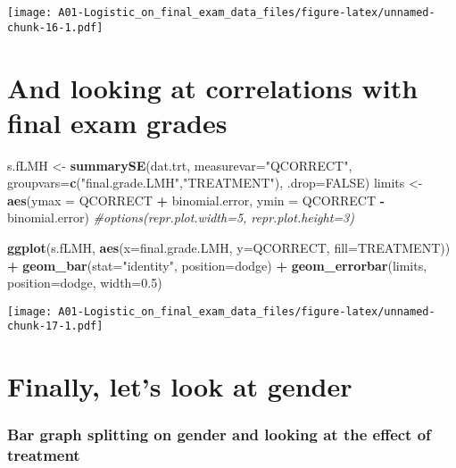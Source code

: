 \documentclass[]{article}
\newenvironment{Shaded}{\begin{snugshade}}{\end{snugshade}}
\newcommand{\KeywordTok}[1]{\textcolor[rgb]{0.13,0.29,0.53}{\textbf{#1}}}
\newcommand{\DataTypeTok}[1]{\textcolor[rgb]{0.13,0.29,0.53}{#1}}
\newcommand{\FloatTok}[1]{\textcolor[rgb]{0.00,0.00,0.81}{#1}}
\newcommand{\StringTok}[1]{\textcolor[rgb]{0.31,0.60,0.02}{#1}}
\newcommand{\CommentTok}[1]{\textcolor[rgb]{0.56,0.35,0.01}{\textit{#1}}}
\newcommand{\OtherTok}[1]{\textcolor[rgb]{0.56,0.35,0.01}{#1}}
\newcommand{\OperatorTok}[1]{\textcolor[rgb]{0.81,0.36,0.00}{\textbf{#1}}}
\newcommand{\NormalTok}[1]{#1}
\begin{document}
\texttt{[image: A01-Logistic\_on\_final\_exam\_data\_files/figure-latex/unnamed-chunk-16-1.pdf]}

\section{And looking at correlations with final exam
grades}\label{and-looking-at-correlations-with-final-exam-grades}

\begin{Shaded}
\begin{Highlighting}[]
\NormalTok{s.fLMH <-}\StringTok{ }\KeywordTok{summarySE}\NormalTok{(dat.trt, }\DataTypeTok{measurevar=}\StringTok{"QCORRECT"}\NormalTok{,}
                              \DataTypeTok{groupvars=}\KeywordTok{c}\NormalTok{(}\StringTok{"final.grade.LMH"}\NormalTok{,}\StringTok{"TREATMENT"}\NormalTok{), }\DataTypeTok{.drop=}\OtherTok{FALSE}\NormalTok{)}
\NormalTok{limits <-}\StringTok{ }\KeywordTok{aes}\NormalTok{(}\DataTypeTok{ymax =}\NormalTok{ QCORRECT }\OperatorTok{+}\StringTok{ }\NormalTok{binomial.error, }\DataTypeTok{ymin =}\NormalTok{ QCORRECT }\OperatorTok{-}\StringTok{ }\NormalTok{binomial.error)}
\CommentTok{#options(repr.plot.width=5, repr.plot.height=3)}

\KeywordTok{ggplot}\NormalTok{(s.fLMH, }\KeywordTok{aes}\NormalTok{(}\DataTypeTok{x=}\NormalTok{final.grade.LMH, }\DataTypeTok{y=}\NormalTok{QCORRECT, }\DataTypeTok{fill=}\NormalTok{TREATMENT)) }\OperatorTok{+}\StringTok{ }
\StringTok{    }\KeywordTok{geom_bar}\NormalTok{(}\DataTypeTok{stat=}\StringTok{"identity"}\NormalTok{, }\DataTypeTok{position=}\NormalTok{dodge) }\OperatorTok{+}\StringTok{ }
\StringTok{    }\KeywordTok{geom_errorbar}\NormalTok{(limits, }\DataTypeTok{position=}\NormalTok{dodge, }\DataTypeTok{width=}\FloatTok{0.5}\NormalTok{)}
\end{Highlighting}
\end{Shaded}

\texttt{[image: A01-Logistic\_on\_final\_exam\_data\_files/figure-latex/unnamed-chunk-17-1.pdf]}

\section{Finally, let's look at
gender}\label{finally-lets-look-at-gender}

\subsubsection{Bar graph splitting on gender and looking at the effect
of
treatment}\label{bar-graph-splitting-on-gender-and-looking-at-the-effect-of-treatment}
\end{document}
